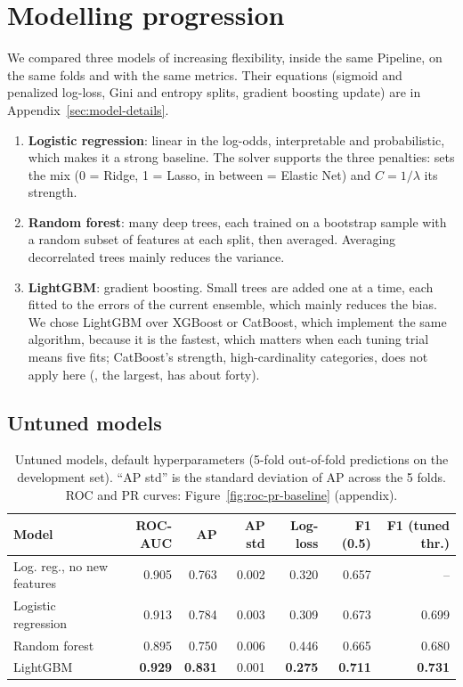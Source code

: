 \section{Modelling progression}
\label{sec:models}

We compared three models of increasing flexibility, inside the same Pipeline,
on the same folds and with the same metrics. Their equations (sigmoid and
penalized log-loss, Gini and entropy splits, gradient boosting update) are in
Appendix~\ref{sec:model-details}.
\begin{enumerate}
  \item \textbf{Logistic regression}: linear in the log-odds, interpretable and
  probabilistic, which makes it a strong baseline. The  solver
  supports the three penalties:  sets the mix (0 = Ridge, 1 =
  Lasso, in between = Elastic Net) and $C = 1/\lambda$ its strength.
  \item \textbf{Random forest}: many deep trees, each trained on a bootstrap
  sample with a random subset of features at each split, then averaged.
  Averaging decorrelated trees mainly reduces the variance.
  \item \textbf{LightGBM}: gradient boosting. Small trees are added one at a
  time, each fitted to the errors of the current ensemble, which mainly reduces
  the bias. We chose LightGBM over XGBoost or CatBoost, which implement the same
  algorithm, because it is the fastest, which matters when each tuning trial
  means five fits; CatBoost's strength, high-cardinality categories, does not
  apply here (, the largest, has about forty).
\end{enumerate}

\subsection{Untuned models}

\begin{table}[H]
\centering
\caption{Untuned models, default hyperparameters (5-fold out-of-fold
predictions on the development set). ``AP std'' is the standard deviation of AP
across the 5 folds. ROC and PR curves: Figure~\ref{fig:roc-pr-baseline}
(appendix).}
\label{tab:models-untuned}
\small
\setlength{\tabcolsep}{4pt}
\begin{tabular}{lrrrrrr}
\toprule
Model & ROC-AUC & AP & AP std & Log-loss & F1 (0.5) & F1 (tuned thr.) \\
\midrule
Log. reg., no new features & 0.905 & 0.763 & 0.002 & 0.320 & 0.657 & -- \\
Logistic regression & 0.913 & 0.784 & 0.003 & 0.309 & 0.673 & 0.699 \\
Random forest       & 0.895 & 0.750 & 0.006 & 0.446 & 0.665 & 0.680 \\
LightGBM            & \textbf{0.929} & \textbf{0.831} & 0.001 & \textbf{0.275} & \textbf{0.711} & \textbf{0.731} \\
\bottomrule
\end{tabular}
\end{table}

